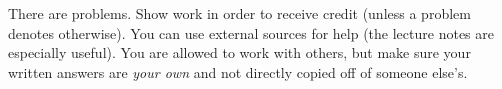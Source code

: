 \begin{tcolorbox}[enhanced,attach boxed title to top center={yshift=-2mm,yshifttext=-1mm},colback=white,colframe=black,colbacktitle=black,title={\textbf{Directions}}]
There are  problems.
Show work in order to receive credit (unless a problem denotes otherwise). You can use external sources for help (the lecture notes are especially useful). You are allowed to work with others, but make sure your written answers are \emph{your own} and not directly copied off of someone else's. 
\end{tcolorbox}